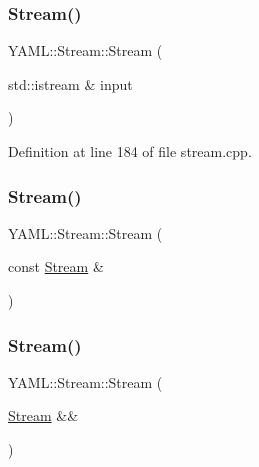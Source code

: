 \subsubsection{\texorpdfstring{Stream()}{Stream()}\hspace{0.1cm}{\footnotesize\ttfamily [1/3]}}
{\footnotesize\ttfamily Y\+A\+M\+L\+::\+Stream\+::\+Stream (\begin{DoxyParamCaption}\item[{std\+::istream \&}]{input }\end{DoxyParamCaption})}



Definition at line 184 of file stream.\+cpp.

\mbox{\label{class_y_a_m_l_1_1_stream_a0ef2538bae425bf413f0130290f30da9}} 
\subsubsection{\texorpdfstring{Stream()}{Stream()}\hspace{0.1cm}{\footnotesize\ttfamily [2/3]}}
{\footnotesize\ttfamily Y\+A\+M\+L\+::\+Stream\+::\+Stream (\begin{DoxyParamCaption}\item[{const \mbox{\hyperlink{class_y_a_m_l_1_1_stream}{Stream}} \&}]{ }\end{DoxyParamCaption})\hspace{0.3cm}{\ttfamily [delete]}}

\mbox{\label{class_y_a_m_l_1_1_stream_a4e4cb943155e16a6fc215ccfe786cc0c}} 
\subsubsection{\texorpdfstring{Stream()}{Stream()}\hspace{0.1cm}{\footnotesize\ttfamily [3/3]}}
{\footnotesize\ttfamily Y\+A\+M\+L\+::\+Stream\+::\+Stream (\begin{DoxyParamCaption}\item[{\mbox{\hyperlink{class_y_a_m_l_1_1_stream}{Stream}} \&\&}]{ }\end{DoxyParamCaption})\hspace{0.3cm}{\ttfamily [delete]}}


